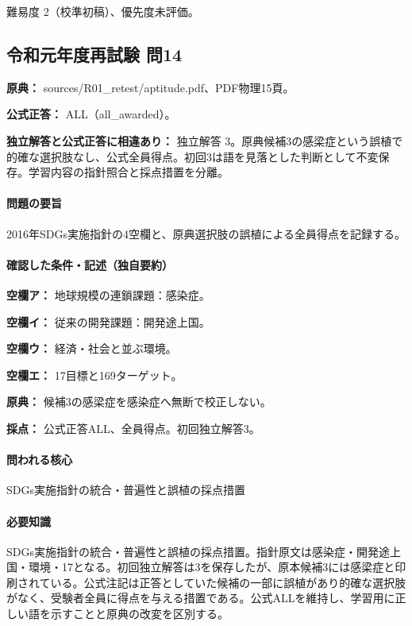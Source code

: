 \par 難易度 2（校準初稿）、優先度未評価。

\subsection{令和元年度再試験 問14}
\label{q:r01-ret-apt-14}

\noindent\textbf{原典：} sources/R01\_retest/aptitude.pdf、PDF物理15頁。

\textbf{公式正答：} ALL（all\_awarded）。

\par\textbf{独立解答と公式正答に相違あり：} 独立解答 3。原典候補3の感梁症という誤植で的確な選択肢なし、公式全員得点。初回3は語を見落とした判断として不変保存。学習内容の指針照合と採点措置を分離。

\paragraph{問題の要旨} 2016年SDGs実施指針の4空欄と、原典選択肢の誤植による全員得点を記録する。

\paragraph{確認した条件・記述（独自要約）}\mbox{}\par

\noindent\textbf{空欄ア：} 地球規模の連鎖課題：感染症。\par

\noindent\textbf{空欄イ：} 従来の開発課題：開発途上国。\par

\noindent\textbf{空欄ウ：} 経済・社会と並ぶ環境。\par

\noindent\textbf{空欄エ：} 17目標と169ターゲット。\par

\noindent\textbf{原典：} 候補3の感梁症を感染症へ無断で校正しない。\par

\noindent\textbf{採点：} 公式正答ALL、全員得点。初回独立解答3。\par

\paragraph{問われる核心} SDGs実施指針の統合・普遍性と誤植の採点措置

\paragraph{必要知識} SDGs実施指針の統合・普遍性と誤植の採点措置。指針原文は感染症・開発途上国・環境・17となる。初回独立解答は3を保存したが、原本候補3には感梁症と印刷されている。公式注記は正答としていた候補の一部に誤植があり的確な選択肢がなく、受験者全員に得点を与える措置である。公式ALLを維持し、学習用に正しい語を示すことと原典の改変を区別する。


